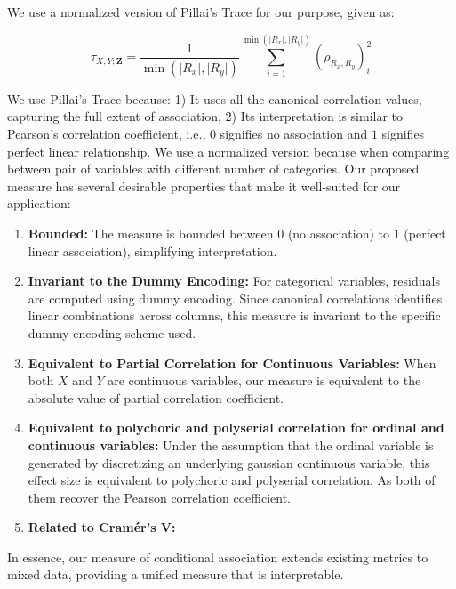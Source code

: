 We use a normalized version of Pillai's Trace for our purpose, given as:

\begin{equation}
	\tau_{X, Y; \bm{Z}} = \frac{1}{\min(\rvert R_x \rvert, \rvert R_y \rvert)}
	\sum_{i=1}^{\min(\rvert R_x \rvert, \rvert R_y \rvert)} (\rho_{R_x, R_y})_i^2
\end{equation}


We use Pillai's Trace because: 1) It uses all the canonical correlation values,
capturing the full extent of association, 2) Its interpretation is similar to
Pearson's correlation coefficient, i.e., $ 0 $ signifies no association and $ 1
$ signifies perfect linear relationship. We use a normalized version because
when comparing between pair of variables with different number of categories.
Our proposed measure has several desirable properties that make it well-suited
for our application:

\begin{enumerate}
	\item \textbf{Bounded: } The measure is bounded between $ 0 $ (no
		association) to $ 1 $ (perfect linear association), simplifying
		interpretation.
	\item \textbf{Invariant to the Dummy Encoding: } For categorical
		variables, residuals are computed using dummy encoding. Since
		canonical correlations identifies linear combinations across
		columns, this measure is invariant to the specific dummy
		encoding scheme used.
	\item \textbf{Equivalent to Partial Correlation for Continuous Variables: }
		When both $ X $ and $ Y $ are continuous variables, our measure
		is equivalent to the absolute value of partial correlation coefficient.
	\item \textbf{Equivalent to polychoric and polyserial correlation for
			ordinal and continuous variables: }
		Under the assumption that the ordinal variable is generated by
		discretizing an underlying gaussian continuous variable, this
		effect size is equivalent to polychoric and polyserial
		correlation. As both of them recover the Pearson correlation
		coefficient.
	\item \textbf{Related to Cram\'er's V: } 
\end{enumerate}

In essence, our measure of conditional association extends existing metrics to mixed data, providing 
a unified measure that is interpretable.

